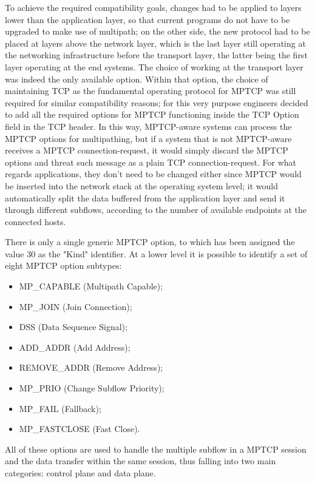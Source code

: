 To achieve the required compatibility goals, changes had to be applied to layers lower than the application layer, so that current programs do not have to be upgraded to make use of multipath; on the other side, the new protocol had to be placed at layers above the network layer, which is the last layer still operating at the networking infrastructure before the transport layer, the latter being the first layer operating at the end systems. The choice of working at the transport layer was indeed the only available option. Within that option, the choice of maintaining TCP as the fundamental operating protocol for MPTCP was still required for similar compatibility reasons; for this very purpose engineers decided to add all the required options for MPTCP functioning inside the TCP Option field in the TCP header. In this way, MPTCP-aware systems can process the MPTCP options for multipathing, but if a system that is not MPTCP-aware receives a MPTCP connection-request, it would simply discard the MPTCP options and threat such message as a plain TCP connection-request. For what regards applications, they don't need to be changed either since MPTCP would be inserted into the network stack at the operating system level; it would automatically split the data buffered from the application layer and send it through different subflows, according to the number of available endpoints at the connected hosts.

\vspace{5mm}
There is only a single generic MPTCP option, to which has been assigned the value 30 as the "Kind" identifier. At a lower level it is possible to identify a set of eight MPTCP option subtypes:

\begin{itemize}
  \item MP\_CAPABLE (Multipath Capable);
  \item MP\_JOIN (Join Connection);
  \item DSS (Data Sequence Signal);
  \item ADD\_ADDR (Add Address);
  \item REMOVE\_ADDR (Remove Address);
  \item MP\_PRIO (Change Subflow Priority);
  \item MP\_FAIL (Fallback);
  \item MP\_FASTCLOSE (Fast Close).
\end{itemize}

All of these options are used to handle the multiple subflow in a MPTCP session and the data transfer within the same session, thus falling into two main categories: control plane and data plane. 

